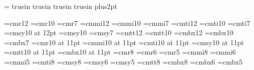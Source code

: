 

\magnification=
 truein
 truein
 truein
 truein
\parskip=3pt plus2pt
\raggedbottom


%
\font\twelverm=cmr12           \font\tenrm=cmr10   \font\sevenrm=cmr7
\font\twelvei=cmmi12           \font\teni=cmmi10   \font\seveni=cmmi7
\font\twelveit=cmti12          \font\tenit=cmti10  \font\sevenit=cmti7
\font\twelvesy=cmsy10 at 12pt  \font\tensy=cmsy10  \font\sevensy=cmsy7
\font\twelvett=cmtt12          \font\tentt=cmtt10  
\font\twelvebf=cmbx12          \font\tenbf=cmbx10  \font\sevenbf=cmbx7
%
\font\elevenrm=cmr10 at 11pt
\font\eleveni=cmmi10 at 11pt
\font\elevenit=cmti10 at 11pt
\font\elevensy=cmsy10 at 11pt
\font\eleventt=cmtt10 at 11pt
\font\elevenbf=cmbx10 at 11pt
%
\font\eightrm=cmr8    \font\sixrm=cmr6    \font\fiverm=cmr5
\font\eighti=cmmi8    \font\sixi=cmmi6    \font\fivei=cmmi5
\font\eightit=cmti8
\font\eightsy=cmsy8   \font\sixsy=cmsy6   \font\fivesy=cmsy5
\font\eighttt=cmtt8
\font\eightbf=cmbx8   \font\sixbf=cmbx6   \font\fivebf=cmbx5
\def\twelvepoint{\def\rm{\fam0\twelverm}
    \textfont0=\twelverm \scriptfont0=\tenrm \scriptscriptfont0=\sevenrm
    \textfont1=\twelvei  \scriptfont1=\teni  \scriptscriptfont1=\seveni
    \textfont2=\twelvesy \scriptfont2=\tensy \scriptscriptfont2=\sevensy
    \textfont\itfam=\twelveit  \def\it{\fam\itfam\twelveit}
    \textfont\ttfam=\twelvett  \def\tt{\fam\ttfam\twelvett}
    \textfont\bffam=\twelvebf  \scriptfont\bffam=\tenbf
      \scriptscriptfont\bffam=\tenbf   \def\bf{\fam\bffam\twelvebf}
    \normalbaselineskip=16pt
    \setbox\strutbox=\hbox{\vrule height12pt depth4pt width0pt}
    \normalbaselines\rm}
\def\elevenpoint{\def\rm{\fam0\elevenrm}
    \textfont0=\elevenrm \scriptfont0=\eightrm \scriptscriptfont0=\sixrm
    \textfont1=\eleveni  \scriptfont1=\eighti  \scriptscriptfont1=\sixi
    \textfont2=\elevensy \scriptfont2=\eightsy \scriptscriptfont2=\sixsy
    \textfont\itfam=\elevenit  \def\it{\fam\itfam\elevenit}
    \textfont\ttfam=\eleventt  \def\tt{\fam\ttfam\eleventt}
    \textfont\bffam=\elevenbf  \scriptfont\bffam=\eightbf
      \scriptscriptfont\bffam=\sixbf   \def\bf{\fam\bffam\elevenbf}
    \normalbaselineskip=13pt
    \setbox\strutbox=\hbox{\vrule height8.5pt depth3.5pt width0pt}
    \normalbaselines\rm}
